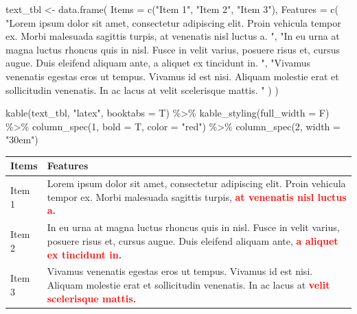 \documentclass[12pt,a4paper,oneside,]{article}
\newenvironment{Shaded}{\begin{snugshade}}{\end{snugshade}}
\newcommand{\AttributeTok}[1]{\textcolor[rgb]{0.77,0.63,0.00}{#1}}
\newcommand{\DecValTok}[1]{\textcolor[rgb]{0.00,0.00,0.81}{#1}}
\newcommand{\FunctionTok}[1]{\textcolor[rgb]{0.00,0.00,0.00}{#1}}
\newcommand{\NormalTok}[1]{#1}
\newcommand{\OtherTok}[1]{\textcolor[rgb]{0.56,0.35,0.01}{#1}}
\newcommand{\SpecialCharTok}[1]{\textcolor[rgb]{0.00,0.00,0.00}{#1}}
\newcommand{\StringTok}[1]{\textcolor[rgb]{0.31,0.60,0.02}{#1}}
\numberwithin{dummy}{section}
\theoremstyle{ocrenumbox}
\theoremstyle{blacknumex}
\theoremstyle{blacknumbox}
\theoremstyle{ocrenum}
\theoremstyle{ocrenum}
\begin{document}
\begin{Shaded}
\begin{Highlighting}[]
\NormalTok{text\_tbl }\OtherTok{\textless{}{-}} \FunctionTok{data.frame}\NormalTok{(}
  \AttributeTok{Items =} \FunctionTok{c}\NormalTok{(}\StringTok{"Item 1"}\NormalTok{, }\StringTok{"Item 2"}\NormalTok{, }\StringTok{"Item 3"}\NormalTok{), }
  \AttributeTok{Features =} \FunctionTok{c}\NormalTok{(}
    \StringTok{"Lorem ipsum dolor sit amet, consectetur adipiscing elit.}
\StringTok{    Proin vehicula tempor ex. Morbi malesuada sagittis turpis,}
\StringTok{    at venenatis nisl luctus a. "}\NormalTok{,}
    \StringTok{"In eu urna at magna luctus rhoncus quis in nisl. Fusce in velit}
\StringTok{    varius, posuere risus et, cursus augue. Duis eleifend aliquam ante,}
\StringTok{    a aliquet ex tincidunt in. "}\NormalTok{,}
    \StringTok{"Vivamus venenatis egestas eros ut tempus. Vivamus id est nisi.}
\StringTok{    Aliquam molestie erat et sollicitudin venenatis. In ac lacus at}
\StringTok{    velit scelerisque mattis. "}
\NormalTok{    ) }
\NormalTok{  )}

\FunctionTok{kable}\NormalTok{(text\_tbl, }\StringTok{"latex"}\NormalTok{, }\AttributeTok{booktabs =}\NormalTok{ T) }\SpecialCharTok{\%\textgreater{}\%} 
  \FunctionTok{kable\_styling}\NormalTok{(}\AttributeTok{full\_width =}\NormalTok{ F) }\SpecialCharTok{\%\textgreater{}\%} 
  \FunctionTok{column\_spec}\NormalTok{(}\DecValTok{1}\NormalTok{, }\AttributeTok{bold =}\NormalTok{ T, }\AttributeTok{color =} \StringTok{"red"}\NormalTok{) }\SpecialCharTok{\%\textgreater{}\%} 
  \FunctionTok{column\_spec}\NormalTok{(}\DecValTok{2}\NormalTok{, }\AttributeTok{width =} \StringTok{"30em"}\NormalTok{)}
\end{Highlighting}
\end{Shaded}

\begin{table}
\centering
\begin{tabular}{>{}l>{\raggedright\arraybackslash}p{30em}}
\toprule
Items & Features\\
\midrule
Item 1 & Lorem ipsum dolor sit amet, consectetur adipiscing elit.
    Proin vehicula tempor ex. Morbi malesuada sagittis turpis,
\textcolor{red}{\textbf{    at venenatis nisl luctus a.}}\\
Item 2 & In eu urna at magna luctus rhoncus quis in nisl. Fusce in velit
    varius, posuere risus et, cursus augue. Duis eleifend aliquam ante,
\textcolor{red}{\textbf{    a aliquet ex tincidunt in.}}\\
Item 3 & Vivamus venenatis egestas eros ut tempus. Vivamus id est nisi.
    Aliquam molestie erat et sollicitudin venenatis. In ac lacus at
\textcolor{red}{\textbf{    velit scelerisque mattis.}}\\
\bottomrule
\end{tabular}
\end{table}
\end{document}
